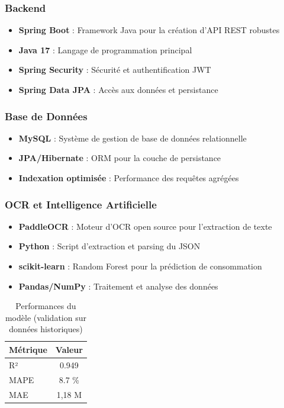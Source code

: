 \documentclass[12pt,a4paper]{article}
\begin{document}
\subsubsection{Backend}
\begin{itemize}
    \item \textbf{Spring Boot} : Framework Java pour la création d'API REST robustes
    \item \textbf{Java 17} : Langage de programmation principal
    \item \textbf{Spring Security} : Sécurité et authentification JWT
    \item \textbf{Spring Data JPA} : Accès aux données et persistance
\end{itemize}

\subsubsection{Base de Données}
\begin{itemize}
    \item \textbf{MySQL} : Système de gestion de base de données relationnelle
    \item \textbf{JPA/Hibernate} : ORM pour la couche de persistance
    \item \textbf{Indexation optimisée} : Performance des requêtes agrégées
\end{itemize}

\subsubsection{OCR et Intelligence Artificielle}
\begin{itemize}
    \item \textbf{PaddleOCR} : Moteur d'OCR open source pour l'extraction de texte
    \item \textbf{Python} : Script d'extraction et parsing du JSON
    \item \textbf{scikit-learn} : Random Forest pour la prédiction de consommation
    \item \textbf{Pandas/NumPy} : Traitement et analyse des données
\end{itemize}

\begin{table}[h]
  \centering
  \caption{Performances du modèle (validation sur données historiques)}
  \begin{tabular}{|l|c|}
    \hline
    \textbf{Métrique} & \textbf{Valeur} \\
    \hline
    R² & 0.949 \\
    MAPE & 8.7 \% \\
    MAE & 1,18 M \\
    \hline
  \end{tabular}
  \label{tab:perf}
\end{table}
\end{document}
